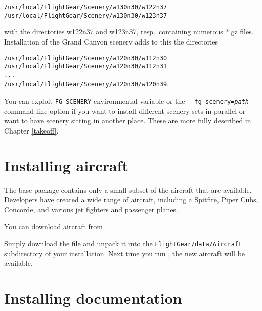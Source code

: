 \noindent
 \texttt{/usr/local/FlightGear/Scenery/w130n30/w122n37}\\
 \texttt{/usr/local/FlightGear/Scenery/w130n30/w123n37}
 \medskip

\noindent 
 with the directories w122n37 and w123n37, resp.\ containing numerous *.gz
files. Installation of the Grand Canyon scenery adds to this the directories
\medskip

\noindent
 \texttt{/usr/local/FlightGear/Scenery/w120n30/w112n30}\\
 \texttt{/usr/local/FlightGear/Scenery/w120n30/w112n31}\\
 \texttt{...}\\
 \texttt{/usr/local/FlightGear/Scenery/w120n30/w120n39}.
 \medskip

You can exploit \texttt{FG\_SCENERY} environmental variable or the \texttt{-$ $-fg-scenery={\it path}} command line option if you want to install different scenery sets in parallel or want to have scenery sitting in another place. These are more fully described in Chapter \ref{takeoff}.

\section{Installing aircraft}

The base \FlightGear{} package contains only a small subset of the aircraft that are available. 
Developers have created a wide range of aircraft, including a Spitfire, Piper Cubs, Concorde, and various jet fighters and passenger planes.

You can download aircraft from 

\medskip
{}
\medskip

Simply download the file and unpack it into the \texttt{FlightGear/data/Aircraft} subdirectory of your installation. Next time you run \FlightGear{}, the new aircraft will be available.

\section{Installing documentation}

